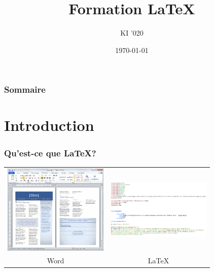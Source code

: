 \documentclass[handout]{beamer}
\title{Formation \LaTeX}
\author{KI '020}
\institute{Ecole des Ponts Paristech}
\date{\today}
\begin{document}
	
	
	\begin{frame}
		\titlepage
	\end{frame}
	
	\begin{frame}
		\frametitle{Sommaire}
		\setcounter{tocdepth}{1}
		\tableofcontents
	\end{frame}
	
	

	
	
	
	\section{Introduction}
	
		\begin{frame}
			\frametitle{Qu'est-ce que \LaTeX ?}
			
			\begin{tabular}{cc}
				\includegraphics[width=5cm]{Images/Introduction/Word}&\includegraphics[width=5cm]{Images/Introduction/Latex}\\
				Word & \LaTeX
			\end{tabular}
	
		\end{frame}
	
\end{document}
